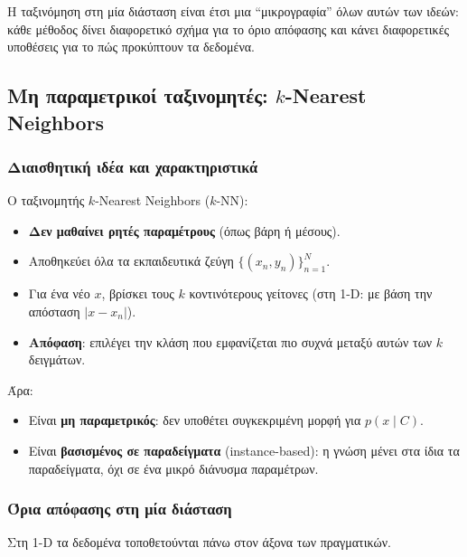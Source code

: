 \documentclass[a4paper,11pt]{article}
\begin{document}
Η ταξινόμηση στη μία διάσταση είναι έτσι μια ``μικρογραφία'' όλων αυτών των ιδεών:
κάθε μέθοδος δίνει διαφορετικό σχήμα για το όριο απόφασης και κάνει
διαφορετικές υποθέσεις για το πώς προκύπτουν τα δεδομένα.

\subsection{Μη παραμετρικοί ταξινομητές: $k$-Nearest Neighbors}

\subsubsection*{Διαισθητική ιδέα και χαρακτηριστικά}

Ο ταξινομητής $k$-Nearest Neighbors ($k$-NN):

\begin{itemize}
  \item \textbf{Δεν μαθαίνει ρητές παραμέτρους} (όπως βάρη ή μέσους).
  \item Αποθηκεύει όλα τα εκπαιδευτικά ζεύγη
        $\{(x_n,y_n)\}_{n=1}^N$.
  \item Για ένα νέο $x$, βρίσκει τους $k$ κοντινότερους γείτονες
        (στη 1-D: με βάση την απόσταση $|x - x_n|$).
  \item \textbf{Απόφαση}: επιλέγει την κλάση που εμφανίζεται πιο συχνά
        μεταξύ αυτών των $k$ δειγμάτων.
\end{itemize}

Άρα:
\begin{itemize}
  \item Είναι \textbf{μη παραμετρικός}: δεν υποθέτει συγκεκριμένη μορφή για $p(x\mid C)$.
  \item Είναι \textbf{βασισμένος σε παραδείγματα} (instance-based):
        η γνώση μένει στα ίδια τα παραδείγματα, όχι σε ένα μικρό διάνυσμα παραμέτρων.
\end{itemize}

\subsubsection*{Όρια απόφασης στη μία διάσταση}

Στη 1-D τα δεδομένα τοποθετούνται πάνω στον άξονα των πραγματικών.
\end{document}
